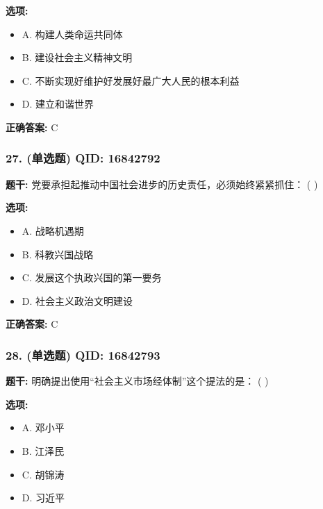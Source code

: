 \documentclass[12pt,UTF8]{ctexart}
\begin{document}
\textbf{选项:}
\begin{itemize}[leftmargin=*]

  \item A. 构建人类命运共同体

  \item B. 建设社会主义精神文明

  \item C. 不断实现好维护好发展好最广大人民的根本利益

  \item D. 建立和谐世界

\end{itemize}

\textbf{正确答案:}
C

\vspace{0.3em}\hrulefill\vspace{0.7em}

\subsubsection*{27. (单选题) \small QID: 16842792}

\textbf{题干:}
党要承担起推动中国社会进步的历史责任，必须始终紧紧抓住： ( )

\textbf{选项:}
\begin{itemize}[leftmargin=*]

  \item A. 战略机遇期

  \item B. 科教兴国战略

  \item C. 发展这个执政兴国的第一要务

  \item D. 社会主义政治文明建设

\end{itemize}

\textbf{正确答案:}
C

\vspace{0.3em}\hrulefill\vspace{0.7em}

\subsubsection*{28. (单选题) \small QID: 16842793}

\textbf{题干:}
明确提出使用“社会主义市场经体制”这个提法的是：  ( )

\textbf{选项:}
\begin{itemize}[leftmargin=*]

  \item A. 邓小平

  \item B. 江泽民

  \item C. 胡锦涛

  \item D. 习近平

\end{itemize}
\end{document}
